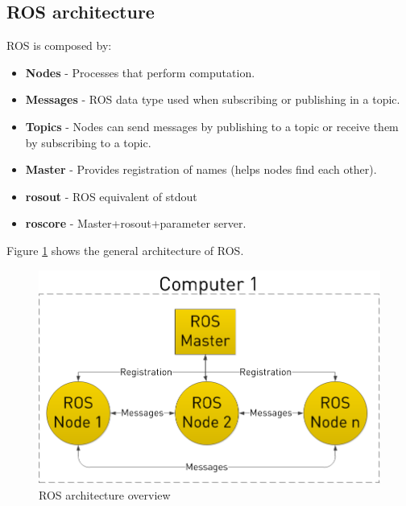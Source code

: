 \documentclass[12pt]{article}
\begin{document}
\subsection{ROS architecture}
ROS is composed by:
\begin{itemize}
\item \textbf{Nodes} - Processes that perform computation.
\item \textbf{Messages} - ROS data type used when subscribing or publishing in a topic. 
\item \textbf{Topics} - Nodes can send messages by publishing to a topic or receive them by subscribing to a topic. 
\item \textbf{Master} - Provides registration of names (helps nodes find each other).
\item \textbf{rosout} - ROS equivalent of stdout 
\item \textbf{roscore} - Master+rosout+parameter server. 
\end{itemize}
Figure \ref{fig:ros_concepts} shows the general architecture of ROS.

\begin{figure}[!htb]
    \centering
    \includegraphics[scale=0.25]{ros_graph.png}
    \caption{ROS architecture overview}
    \label{fig:ros_concepts}
\end{figure}
\end{document}

